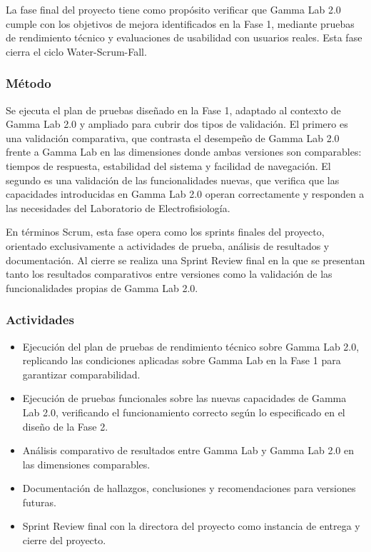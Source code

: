 \documentclass[12pt,letterpaper]{article}
\begin{document}
La fase final del proyecto tiene como propósito verificar que Gamma Lab 2.0 cumple con los objetivos de mejora identificados en la Fase 1, mediante pruebas de rendimiento técnico y evaluaciones de usabilidad con usuarios reales. Esta fase cierra el ciclo Water-Scrum-Fall.


\subsubsection{Método}

Se ejecuta el plan de pruebas diseñado en la Fase 1, adaptado al contexto de Gamma Lab 2.0 y ampliado para cubrir dos tipos de validación. El primero es una validación comparativa, que contrasta el desempeño de Gamma Lab 2.0 frente a Gamma Lab en las dimensiones donde ambas versiones son comparables: tiempos de respuesta, estabilidad del sistema y facilidad de navegación. El segundo es una validación de las funcionalidades nuevas, que verifica que las capacidades introducidas en Gamma Lab 2.0 operan correctamente y responden a las necesidades del Laboratorio de Electrofisiología.

En términos Scrum, esta fase opera como los sprints finales del proyecto, orientado exclusivamente a actividades de prueba, análisis de resultados y documentación. Al cierre se realiza una Sprint Review final en la que se presentan tanto los resultados comparativos entre versiones como la validación de las funcionalidades propias de Gamma Lab 2.0.

\subsubsection{Actividades}

\begin{itemize}
  \item Ejecución del plan de pruebas de rendimiento técnico sobre Gamma Lab 2.0, replicando las condiciones aplicadas sobre Gamma Lab en la Fase 1 para garantizar comparabilidad.
 \item Ejecución de pruebas funcionales sobre las nuevas capacidades de Gamma Lab 2.0, verificando el funcionamiento correcto según lo especificado en el diseño de la Fase 2.
 \item Análisis comparativo de resultados entre Gamma Lab y Gamma Lab 2.0 en las dimensiones comparables.
 \item Documentación de hallazgos, conclusiones y recomendaciones para versiones futuras.
 \item Sprint Review final con la directora del proyecto como instancia de entrega y cierre del proyecto.
\end{itemize}
\end{document}
